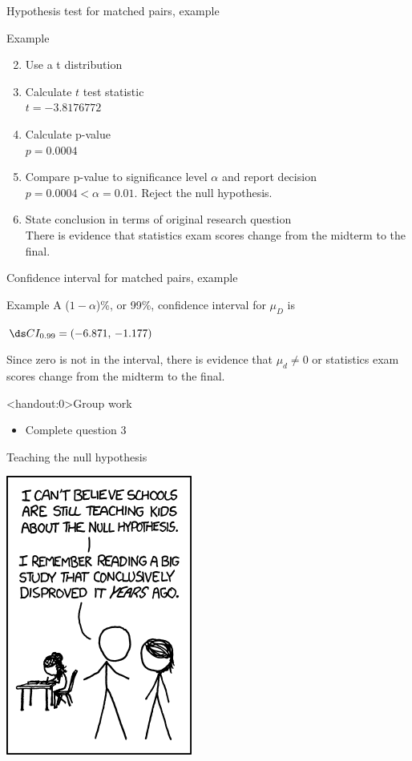 \documentclass[xcolor=table, handout]{beamer}
\begin{document}
\begin{frame}{Hypothesis test for matched pairs, example}
\begin{exampleblock}{Example}
\large
\begin{enumerate}
\setcounter{enumi}{1}

\item Use a t distribution
\pause\item Calculate $t$ test statistic\\
\pause$t=-3.8176772$
\pause\item Calculate p-value\\
\pause$p = 0.0004$
\pause\item Compare p-value to significance level $\alpha$ and report decision\\
\pause$p = 0.0004 < \alpha = 0.01$. Reject the null hypothesis.
\pause\item State conclusion in terms of original research question\\
\pause There is evidence that statistics exam scores change from the midterm to the final.
\end{enumerate}

\end{exampleblock}
\end{frame}

\begin{frame}{Confidence interval for matched pairs, example}
\begin{exampleblock}{Example}
\large
A ($1-\alpha$)\%, or 99\%, confidence interval for $\mu_D$ is\\
\pause\medskip
{\centering $\ds CI_{0.99} = (-6.871, \, -1.177)$ \par}
\medskip

\pause Since zero is not in the interval, there is evidence that $\mu_d \ne 0$ or statistics exam scores change from the midterm to the final.

\end{exampleblock}
\end{frame}

\begin{frame}<handout:0>{Group work}
\begin{block}{}
\large
\begin{itemize}
\item Complete question 3
\end{itemize}
\end{block}
\end{frame}


\begin{frame}{Teaching the null hypothesis}
\smallskip
{\centering
\includegraphics[width=2 in]{../images/ch09_null_hypothesis}
\par}
\end{frame}
\end{document}
